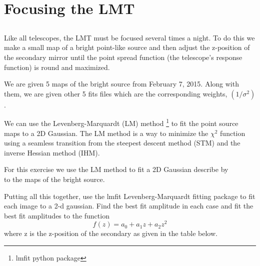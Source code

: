 \section{Focusing the LMT}

\subsection{}
Like all telescopes, the LMT must be focused several times a night.
To do this we make a small map of a bright point-like source and then adjust the z-position of the secondary mirror until the point spread function (the telescope’s response function) is round and maximized. 

We are given 5 maps of the bright source from February 7, 2015. Along with them, we are given other 5 fits files which are the corresponding weights, $(1/\sigma^2)$. 

We can use the Levenberg-Marquardt (LM) method \footnote{lmfit python package} to fit the point source maps to a 2D Gaussian. The LM method is a way to minimize the $\chi^2$ function using a seamless transition from the steepest descent method (STM) and the inverse Hessian method (IHM).

For this exercise we use the LM method to fit a 2D Gaussian describe by
\begin{equation}
    
\end{equation}
to the maps of the bright source. 


Putting all this together, use the lmfit Levenberg-Marquardt fitting package to fit each image to a 2-d gaussian. 
Find the best fit amplitude in each case and fit the best fit amplitudes to the function
\begin{equation}
    f(z)=a_0+a_1z+a_2z^2
\end{equation}
where z is the z-position of the secondary as given in the table below.


